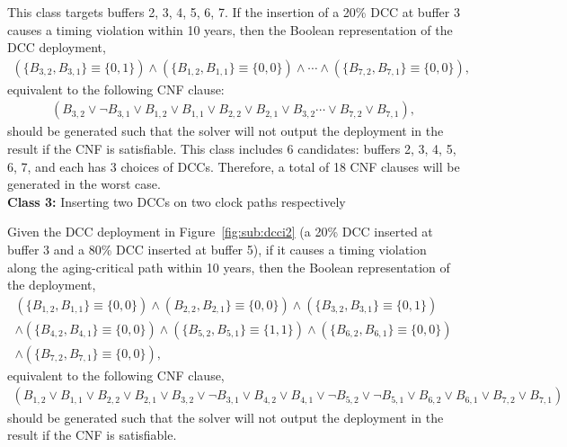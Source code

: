 This class targets buffers 2, 3, 4, 5, 6, 7. If the insertion of a 20\% DCC at buffer 3 causes a timing violation within 10 years, then the Boolean representation of the DCC deployment, 
{\fontsize{9}{10}
\begin{gather*}
	\left(\{B_{3,2}, B_{3,1}\} \equiv \{0, 1\} \right) \land \left( \{B_{1,2}, B_{1,1}\} \equiv \{0, 0\} \right) \land \dotsb 
	\land \left( \{B_{7,2}, B_{7,1}\} \equiv \{0, 0\} \right),
\end{gather*}}equivalent to the following CNF clause:
{\fontsize{9}{10}
\begin{gather*}
	(B_{3,2} \lor \neg B_{3,1} \lor B_{1,2} \lor B_{1,1} \lor B_{2,2} \lor B_{2,1} \lor B_{3,2} \dotsb  
\lor B_{7,2} \lor B_{7,1}),
\end{gather*}}should be generated such that the solver will not output the deployment in the result if the CNF is satisfiable. This class includes 6 candidates: buffers 2, 3, 4, 5, 6, 7, and each has 3 choices of DCCs. Therefore, a total of 18 CNF clauses will be generated in the worst case.\\


\noindent \textbf{Class 3:} Inserting two DCCs on two clock paths respectively

Given the DCC deployment in Figure~\ref{fig:sub:dcci2} (a 20\% DCC inserted at buffer 3 and a 80\% DCC inserted at buffer 5), if it causes a timing violation along the aging-critical path within 10 years, then the Boolean representation of the deployment,
{\fontsize{9}{10}
\begin{gather*}
\left(\{B_{1,2}, B_{1,1}\} \equiv \{0, 0\} \right) \land \left(B_{2,2}, B_{2,1}\} \equiv \{0, 0\} \right) \land \left(\{B_{3,2}, B_{3,1}\} \equiv \{0, 1\} \right) \\ 
\land \left( \{B_{4,2}, B_{4,1}\} \equiv \{0, 0\} \right) \land \left(\{B_{5,2}, B_{5,1}\} \equiv \{1, 1\} \right) \land \left( \{B_{6,2}, B_{6,1}\} \equiv \{0, 0\} \right)\\
\land \left( \{B_{7,2}, B_{7,1}\} \equiv \{0, 0\} \right),
\end{gather*}}equivalent to the following CNF clause,
{\fontsize{9}{10}
\begin{gather*}
(B_{1,2} \lor B_{1,1} \lor B_{2,2} \lor B_{2,1} \lor B_{3,2}  \lor \neg B_{3,1} \lor B_{4,2} \lor B_{4,1} \lor \neg B_{5,2} \lor \neg B_{5,1} \lor B_{6,2} \lor B_{6,1} \lor B_{7,2} \lor B_{7,1} )
\end{gather*}}should be generated such that the solver will not output the deployment in the result if the CNF is satisfiable.

